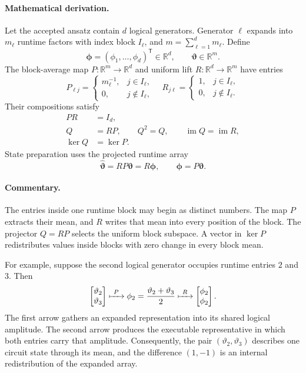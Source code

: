 \documentclass[10pt,twocolumn]{article}
\newcommand{\R}{\mathbb R}
\newcommand{\mathderiv}{\paragraph{Mathematical derivation.}}
\newcommand{\commentaryblock}{\paragraph{Commentary.}}
\begin{document}
\mathderiv Let the accepted ansatz contain \(d\) logical generators. Generator
\(\ell\) expands into \(m_\ell\) runtime factors with index block
\(I_\ell\), and \(m=\sum_{\ell=1}^d m_\ell\). Define
\begin{equation}
\bm\phi=(\phi_1,\ldots,\phi_d)^{\mathsf T}\in\R^d,\qquad
\bm\vartheta\in\R^m.
\label{eq:logical-runtime-types}
\end{equation}
The block-average map \(P:\R^m\to\R^d\) and uniform lift
\(R:\R^d\to\R^m\) have entries
\begin{equation}
P_{\ell j}=
\begin{cases}
m_\ell^{-1},&j\in I_\ell,\\
0,&j\notin I_\ell,
\end{cases}
\quad
R_{j\ell}=
\begin{cases}
1,&j\in I_\ell,\\
0,&j\notin I_\ell.
\end{cases}
\label{eq:block-maps}
\end{equation}
Their compositions satisfy
\begin{align}
PR&=I_d,\nonumber\\
Q&=RP,\qquad Q^2=Q,\qquad \operatorname{im}Q=\operatorname{im}R,\nonumber\\
\ker Q&=\ker P.
\label{eq:block-map-identities}
\end{align}
State preparation uses the projected runtime array
\begin{equation}
\widehat{\bm\vartheta}=RP\bm\vartheta=R\bm\phi,\qquad
\bm\phi=P\bm\vartheta.
\label{eq:runtime-state-map}
\end{equation}

\commentaryblock The entries inside one runtime block may begin as distinct
numbers. The map \(P\) extracts their mean, and \(R\) writes that mean into
every position of the block. The projector \(Q=RP\) selects the uniform block
subspace. A vector in \(\ker P\) redistributes values inside blocks with zero
change in every block mean.

For example, suppose the second logical generator occupies runtime entries
\(2\) and \(3\). Then
\begin{equation}
\begin{bmatrix}\vartheta_2\\\vartheta_3\end{bmatrix}
\xmapsto{\ P\ }
\phi_2=\frac{\vartheta_2+\vartheta_3}{2}
\xmapsto{\ R\ }
\begin{bmatrix}\phi_2\\\phi_2\end{bmatrix}.
\label{eq:one-block-example}
\end{equation}
The first arrow gathers an expanded representation into its shared logical
amplitude. The second arrow produces the executable representative in which
both entries carry that amplitude. Consequently, the pair
\((\vartheta_2,\vartheta_3)\) describes one circuit state through its mean, and
the difference \((1,-1)\) is an internal redistribution of the expanded array.
\end{document}
